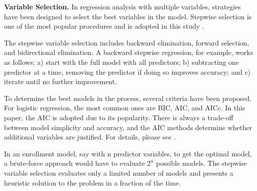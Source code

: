 \documentclass[12pt,english]{report}
\begin{document}
\vspace{0.15in}
\noindent \textbf{Variable Selection. }  In regression analysis with multiple variables, 
strategies have been designed to select the best variables in the model. Stepwise selection is one 
of the most popular procedures and is adopted in this study \citep{konishi2008information}.

The stepwise variable selection includes backward elimination, forward selection, and bidirectional elimination. A backward stepwise regression, for example, works as follows: a) start with the full model with all predictors; b) subtracting one predictor at a time, removing the predictor if doing so improves accuracy; and c) iterate until no further improvement. 


To determine the best models in the process, several criteria have been proposed. For logistic regression, the most common ones are BIC, AIC, and AICc. In this paper, the AIC is adopted due to its popularity.  There is always a trade-off between model simplicity and accuracy, and the AIC methods determine whether additional variables are justified. For details, please see \citep{wagenmakers2004aic}.
     
In an enrollment model, say with n predictor variables, to get the optimal model, a brute-force approach would have to evaluate $2^{n}$ possible models. The stepwise variable selection evaluates only a limited number of models and presents a heuristic solution to the problem in a fraction of the time.  
\end{document}
